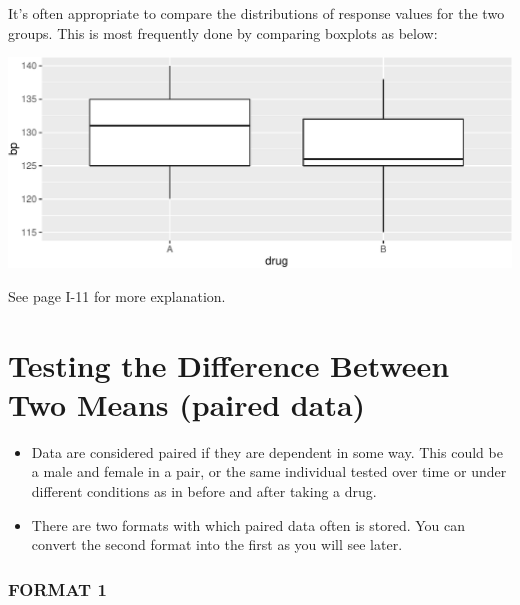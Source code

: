 \documentclass[twoside, 12pt]{article}
\newenvironment{Shaded}{\begin{snugshade}}{\end{snugshade}}
\newcommand{\KeywordTok}[1]{\textcolor[rgb]{0.13,0.29,0.53}{\textbf{{#1}}}}
\newcommand{\DataTypeTok}[1]{\textcolor[rgb]{0.13,0.29,0.53}{{#1}}}
\newcommand{\StringTok}[1]{\textcolor[rgb]{0.31,0.60,0.02}{{#1}}}
\newcommand{\NormalTok}[1]{{#1}}
\begin{document}
It's often appropriate to compare the distributions of response values
for the two groups. This is most frequently done by comparing boxplots
as below:

\begin{Shaded}
\end{Shaded}

\includegraphics{skeleton_files/figure-latex/unnamed-chunk-57-1.pdf}

See page I-11 for more explanation.

\section{\texorpdfstring{Testing the Difference Between \textbf{Two}
Means (paired
data)}{Testing the Difference Between Two Means (paired data)}}\label{testing-the-difference-between-two-means-paired-data}

\begin{itemize}
\item
  Data are considered paired if they are dependent in some way. This
  could be a male and female in a pair, or the same individual tested
  over time or under different conditions as in before and after taking
  a drug.
\item
  There are two formats with which paired data often is stored. You can
  convert the second format into the first as you will see later.
\end{itemize}

\subsubsection*{FORMAT 1}\label{format-1}
\end{document}
